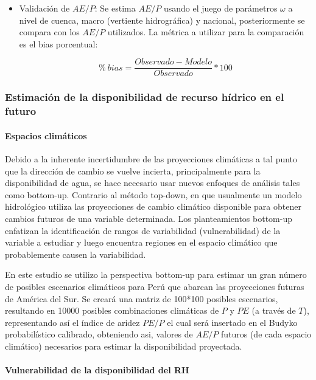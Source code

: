\documentclass[12pt]{article}
\begin{document}
\begin{itemize}
  \item Validación de $AE/P$: Se estima $AE/P$ usando el juego de parámetros $\omega$ a nivel de cuenca, macro (vertiente hidrográfica) y nacional, posteriormente se compara con los $AE/P$ utilizados. La métrica a utilizar para la comparación es el bias porcentual:
  
    \begin{equation}
    \%\ bias = \frac{Observado-Modelo}{Observado}*100
    \end{equation}
\end{itemize}


\subsubsection{Estimación de la disponibilidad de recurso hídrico en el futuro}

\paragraph{Espacios climáticos}\mbox{}

Debido a la inherente incertidumbre de las proyecciones climáticas a tal punto que la dirección de cambio se vuelve incierta, principalmente para la disponibilidad de agua, se hace necesario usar nuevos enfoques de análisis tales como bottom-up. Contrario al método top-down, en que usualmente un modelo hidrológico utiliza las proyecciones de cambio climático disponible para obtener cambios futuros de una variable determinada. Los planteamientos bottom-up enfatizan la identificación de rangos de variabilidad (vulnerabilidad) de la variable a estudiar y luego encuentra regiones en el espacio climático que probablemente causen la variabilidad.

En este estudio se utilizo la perspectiva bottom-up para estimar un gran número de posibles escenarios climáticos para Perú que abarcan las proyecciones futuras de América del Sur. Se creará una matriz de 100*100 posibles escenarios, resultando en 10000 posibles combinaciones climáticas de $P$ y $PE$ (a través de $T$), representando así el índice de aridez $PE/P$ el cual será insertado en el Budyko probabilístico calibrado, obteniendo asi, valores de $AE/P$ futuros (de cada espacio climático) necesarios para estimar la disponibilidad proyectada.

\paragraph{Vulnerabilidad de la disponibilidad del RH}\mbox{}
\end{document}
